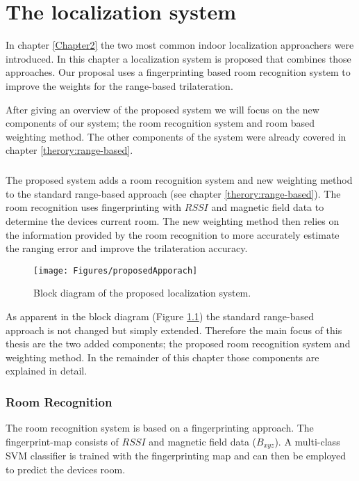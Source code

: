 \chapter{The localization system}

\label{Chapter3}

In chapter \ref{Chapter2} the two most common indoor localization approachers were introduced. In this chapter a localization system is proposed that combines those approaches. Our proposal uses a fingerprinting based room recognition system to improve the weights for the range-based trilateration.

After giving an overview of the proposed system we will focus on the new components of our system; the room recognition system and room based weighting method. The other components of the system were already covered in chapter \ref{therory:range-based}.

\paragraph{}The proposed system adds a room recognition system and new weighting method to the standard range-based approach (see chapter \ref{therory:range-based}). The room recognition uses fingerprinting with $RSSI$ and magnetic field data to determine the devices current room. The new weighting method then relies on the information provided by the room recognition to more accurately estimate the ranging error and improve the trilateration accuracy.

\begin{figure}[ht]
\centering
\texttt{[image: Figures/proposedApporach]}
\decoRule
\caption[Proposed localization system]{Block diagram of the proposed localization system.}
\label{fig:proposedApproach}
\end{figure}

As apparent in the block diagram (Figure \ref{fig:proposedApproach}) the standard range-based approach is not changed but simply extended. Therefore the main focus of this thesis are the two added components; the proposed room recognition system and weighting method. In the remainder of this chapter those components are explained in detail. 

\subsection{Room Recognition}
The room recognition system is based on a fingerprinting approach. The fingerprint-map consists of $RSSI$ and magnetic field data ($B_{xyz}$). A multi-class SVM classifier is trained with the fingerprinting map and can then be employed to predict the devices room.

